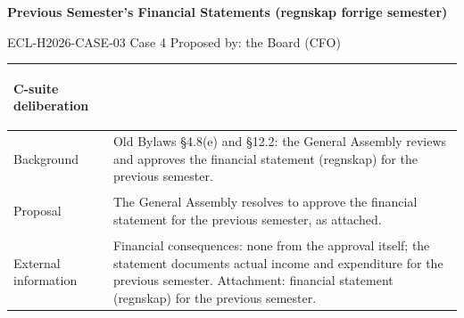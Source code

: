 \documentclass{../../../Common/Latex/Templates/rapport}
\begin{document}
\reportmainmatter
\small
\setlength{\parindent}{0pt}
\setlength{\tabcolsep}{6pt}
\renewcommand{\arraystretch}{1.2}

\begin{center}
  {\Large\bfseries Previous Semester's Financial Statements (regnskap forrige semester)}\par
  \vspace{0.15cm}
  {\normalsize ECL-H2026-CASE-03 \textperiodcentered{} Case 4 \textperiodcentered{} Proposed by: the Board (CFO)}\par
  \vspace{0.1cm}
  {\small \meetingline}\par
\end{center}

\vspace{0.3cm}
\begin{tabularx}{\textwidth}{|>{\bfseries\raggedright\arraybackslash}p{4.2cm}|X|}
  \hline
  C-suite deliberation & \rule{0pt}{4.1cm} \\
  \hline
  Background           & Old Bylaws \S4.8(e) and \S12.2: the General Assembly reviews and approves the financial statement (regnskap) for the previous semester. \\
  \hline
  Proposal             & The General Assembly resolves to approve the financial statement for the previous semester, as attached. \\
  \hline
  External information & Financial consequences: none from the approval itself; the statement documents actual income and expenditure for the previous semester. Attachment: financial statement (regnskap) for the previous semester. \\
  \hline
\end{tabularx}
\end{document}

